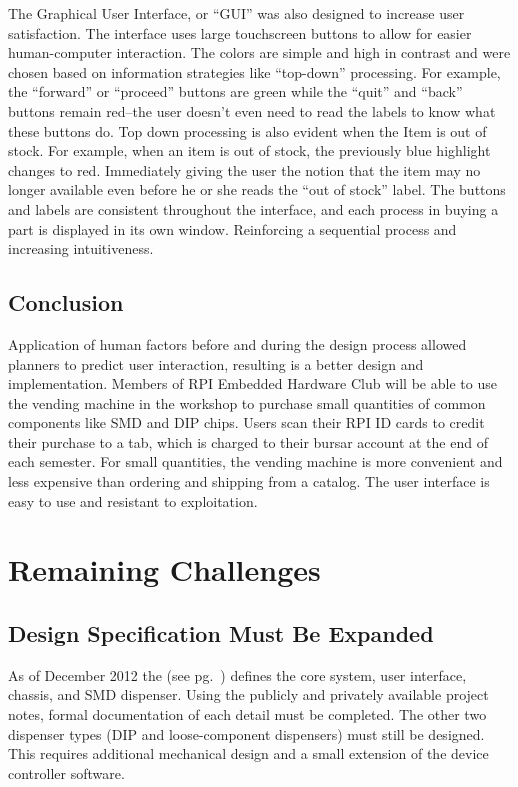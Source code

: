 \documentclass[12pt,oneside,final]{article}
\begin{document}
The Graphical User Interface, or ``GUI'' was also designed to increase user satisfaction. The interface uses large touchscreen buttons to allow for easier human-computer interaction. The colors are simple and high in contrast and were chosen based on information strategies like ``top-down'' processing. For example, the ``forward'' or ``proceed'' buttons are green while the ``quit'' and ``back'' buttons remain red--the user doesn't even need to read the labels to know what these buttons do. Top down processing is also evident when the Item is out of stock. For example, when an item is out of stock, the previously blue highlight changes to red. Immediately giving the user the notion that the item may no longer available even before he or she reads the ``out of stock'' label. The buttons and labels are consistent throughout the interface, and each process in buying a part is displayed in its own window. Reinforcing a sequential process and increasing intuitiveness.

\subsection{Conclusion}
Application of human factors before and during the design process allowed planners to predict user interaction, resulting is a better design and implementation. Members of RPI Embedded Hardware Club will be able to use the vending machine in the workshop to purchase small quantities of common components like SMD and DIP chips. Users scan their RPI ID cards to credit their purchase to a tab, which is charged to their bursar account at the end of each semester. For small quantities, the vending machine is more convenient and less expensive than ordering and shipping from a catalog. The user interface is easy to use and resistant to exploitation.


\pagebreak
\section{Remaining Challenges}
\label{sec:challenges}

\subsection{Design Specification Must Be Expanded}
As of December 2012 the  (see pg.~\pageref{sec:spec}) defines the core system, user interface, chassis, and SMD dispenser. Using the publicly and privately available project notes, formal documentation of each detail must be completed. The other two dispenser types (DIP and loose-component dispensers) must still be designed. This requires additional mechanical design and a small extension of the device controller software.
\end{document}
